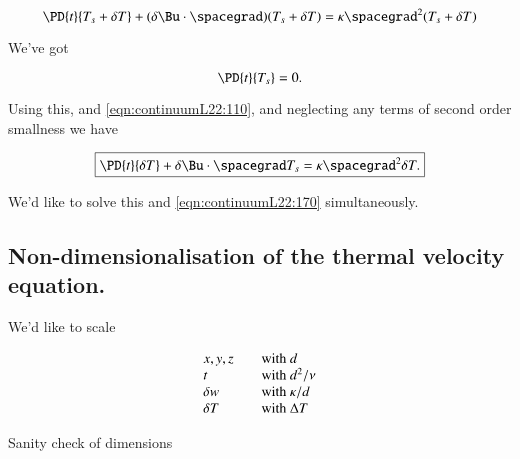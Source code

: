 \begin{equation}\label{eqn:continuumL22:190}
\PD{t}{T_s + \delta T} + (\delta \Bu \cdot \spacegrad) (T_s + \delta T) = \kappa \spacegrad^2 (T_s + \delta T)
\end{equation}

We've got

\begin{equation}\label{eqn:continuumL22:210}
\PD{t}{T_s} = 0.
\end{equation}

Using this, and \ref{eqn:continuumL22:110}, and neglecting any terms of second order smallness we have

\begin{equation}\label{eqn:continuumL22:230}
\boxed{
\PD{t}{\delta T} + \delta \Bu \cdot \spacegrad T_s = \kappa \spacegrad^2 \delta T.
}
\end{equation}

We'd like to solve this and \ref{eqn:continuumL22:170} simultaneously.

\subsection{Non-dimensionalisation of the thermal velocity equation.}

We'd like to scale

\begin{equation}\label{eqn:continuumL22:250}
\begin{array}{l l}
x,y,z & \quad \mbox{with $d$} \\
t & \quad \mbox{with $d^2/\nu$} \\
\delta w & \quad \mbox{with $\kappa/d$} \\
\delta T & \quad \mbox{with $\Delta T$}
\end{array}
\end{equation}

Sanity check of dimensions

